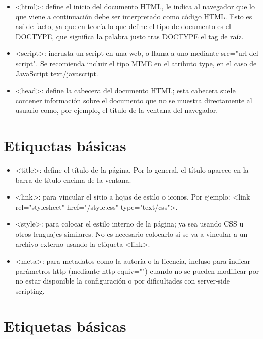 \documentclass[11pt]{article}
\begin{document}
\begin{itemize}
\item <html>: define el inicio del documento HTML, le indica al navegador que lo que
viene a continuación debe ser interpretado como código HTML. Esto es así de
facto, ya que en teoría lo que define el tipo de documento es el DOCTYPE, que
significa la palabra justo tras DOCTYPE el tag de raíz.

\item <script>: incrusta un script en una web, o llama a uno mediante src="url del
script". Se recomienda incluir el tipo MIME en el atributo type, en el caso de
JavaScript text/javascript.

\item <head>: define la cabecera del documento HTML; esta cabecera suele contener
información sobre el documento que no se muestra directamente al usuario como,
por ejemplo, el título de la ventana del navegador.
\end{itemize}

\section*{Etiquetas básicas}
\label{sec:orgheadline4}

\begin{itemize}
\item <title>: define el título de la página. Por lo general, el título aparece en la
barra de título encima de la ventana.

\item <link>: para vincular el sitio a hojas de estilo o iconos. Por ejemplo:
<link rel="stylesheet" href="/style.css" type="text/css">.

\item <style>: para colocar el estilo interno de la página; ya sea usando CSS u otros
lenguajes similares. No es necesario colocarlo si se va a vincular a un archivo
externo usando la etiqueta <link>.

\item <meta>: para metadatos como la autoría o la licencia, incluso para indicar
parámetros http (mediante http-equiv="") cuando no se pueden modificar por no
estar disponible la configuración o por dificultades con server-side scripting.
\end{itemize}

\section*{Etiquetas básicas}
\label{sec:orgheadline5}
\end{document}
